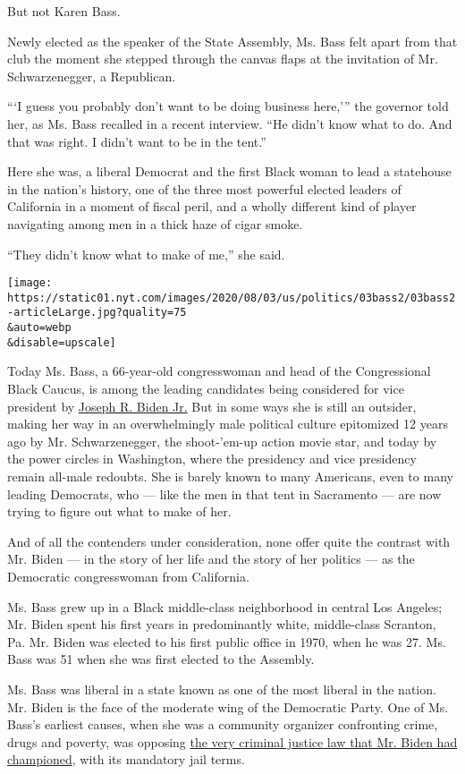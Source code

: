 But not Karen Bass.

Newly elected as the speaker of the State Assembly, Ms. Bass felt apart
from that club the moment she stepped through the canvas flaps at the
invitation of Mr. Schwarzenegger, a Republican.

```I guess you probably don't want to be doing business here,''' the
governor told her, as Ms. Bass recalled in a recent interview. ``He
didn't know what to do. And that was right. I didn't want to be in the
tent.''

Here she was, a liberal Democrat and the first Black woman to lead a
statehouse in the nation's history, one of the three most powerful
elected leaders of California in a moment of fiscal peril, and a wholly
different kind of player navigating among men in a thick haze of cigar
smoke.

``They didn't know what to make of me,'' she said.

\texttt{[image: https://static01.nyt.com/images/2020/08/03/us/politics/03bass2/03bass2-articleLarge.jpg?quality=75\\\&auto=webp\\\&disable=upscale]}

Today Ms. Bass, a 66-year-old congresswoman and head of the
Congressional Black Caucus, is among the leading candidates being
considered for vice president by
\href{https://www.nytimes.com/interactive/2020/us/elections/joe-biden.html}{Joseph
R. Biden Jr.} But in some ways she is still an outsider, making her way
in an overwhelmingly male political culture epitomized 12 years ago by
Mr. Schwarzenegger, the shoot-'em-up action movie star, and today by the
power circles in Washington, where the presidency and vice presidency
remain all-male redoubts. She is barely known to many Americans, even to
many leading Democrats, who --- like the men in that tent in Sacramento
--- are now trying to figure out what to make of her.

And of all the contenders under consideration, none offer quite the
contrast with Mr. Biden --- in the story of her life and the story of
her politics --- as the Democratic congresswoman from California.

Ms. Bass grew up in a Black middle-class neighborhood in central Los
Angeles; Mr. Biden spent his first years in predominantly white,
middle-class Scranton, Pa. Mr. Biden was elected to his first public
office in 1970, when he was 27. Ms. Bass was 51 when she was first
elected to the Assembly.

Ms. Bass was liberal in a state known as one of the most liberal in the
nation. Mr. Biden is the face of the moderate wing of the Democratic
Party. One of Ms. Bass's earliest causes, when she was a community
organizer confronting crime, drugs and poverty, was opposing
\href{https://www.nytimes.com/2019/06/25/us/joe-biden-crime-laws.html}{the
very criminal justice law that Mr. Biden had championed}, with its
mandatory jail terms.

